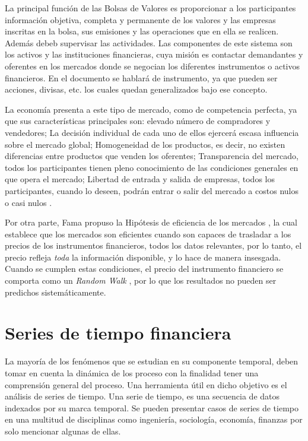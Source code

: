 La principal función de las Bolsas de Valores es proporcionar a los
participantes información objetiva, completa y permanente de los valores y las
empresas inscritas en la bolsa, sus emisiones y las operaciones que en ella se
realicen. Además debeb supervisar las actividades. Las componentes de este
sistema son los activos y las instituciones financieras, cuya misión es
contactar demandantes y oferentes en los mercados donde se negocian los
diferentes instrumentos o activos financieros. En el documento se hablará de
instrumento, ya que pueden ser acciones, divisas, etc. los cuales quedan
generalizados bajo ese concepto.

La economía presenta a este tipo de mercado, como de competencia perfecta, ya
que sus características principales son: elevado número de compradores y
vendedores; La decisión individual de cada uno de ellos ejercerá escasa
influencia sobre el mercado global; Homogeneidad de los productos, es decir, no
existen diferencias entre productos que venden los oferentes; Transparencia del
mercado, todos los participantes tienen pleno conocimiento de las condiciones
generales en que opera el mercado; Libertad de entrada y salida de empresas,
todos los participantes, cuando lo deseen, podrán entrar o salir del mercado a
costos nulos o casi nulos \cite{mankiw2011principles}. 

Por otra parte, Fama propuso la Hipótesis de eficiencia de los mercados
\cite{malkiel2012efficient}, la cual establece que los mercados son eficientes
cuando son capaces de trasladar a los precios de los instrumentos financieros,
todos los datos relevantes, por lo tanto, el precio refleja \emph{toda} la
información disponible, y lo hace de manera insesgada. Cuando se cumplen estas
condiciones, el precio del instrumento financiero se comporta como un
\emph{Random Walk} \cite{fama1965random}, por lo que los resultados no pueden
ser predichos sistemáticamente.

\section{Series de tiempo financiera}

La mayoría de los fenómenos que se estudian en su componente temporal, deben
tomar en cuenta la dinámica de los proceso con la finalidad tener una
comprensión general del proceso. Una herramienta útil en dicho objetivo es el
análisis de series de tiempo. Una serie de tiempo, es una secuencia de datos
indexados por su marca temporal. Se pueden presentar casos de series de tiempo
en una multitud de disciplinas como ingeniería, sociología, economía, finanzas
por solo mencionar algunas de ellas.

